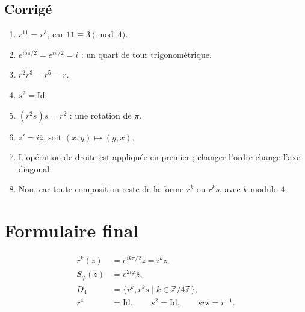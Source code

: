 \documentclass[11pt,a4paper]{article}
\newcommand{\Z}{\mathbb{Z}}
\newcommand{\id}{\mathrm{Id}}
\newcommand{\conj}[1]{\overline{#1}}
\begin{document}
\subsection*{Corrig\'e}

\begin{enumerate}
  \item $r^{11}=r^3$, car $11\equiv3\pmod4$.
  \item $e^{i5\pi/2}=e^{i\pi/2}=i$ : un quart de tour trigonom\'etrique.
  \item $r^2r^3=r^5=r$.
  \item $s^2=\id$.
  \item $(r^2s)s=r^2$ : une rotation de $\pi$.
  \item $z'=i\conj z$, soit $(x,y)\mapsto(y,x)$.
  \item L'op\'eration de droite est appliqu\'ee en premier ; changer l'ordre change l'axe diagonal.
  \item Non, car toute composition reste de la forme $r^k$ ou $r^ks$, avec $k$ modulo $4$.
\end{enumerate}

\section*{Formulaire final}

\[
\boxed{
\begin{aligned}
r^k(z)&=e^{ik\pi/2}z=i^kz,\\
S_{\varphi}(z)&=e^{2i\varphi}\conj z,\\
D_4&=\{r^k,r^ks\mid k\in\Z/4\Z\},\\
r^4&=\id,\qquad s^2=\id,\qquad srs=r^{-1}.
\end{aligned}}
\]
\end{document}
